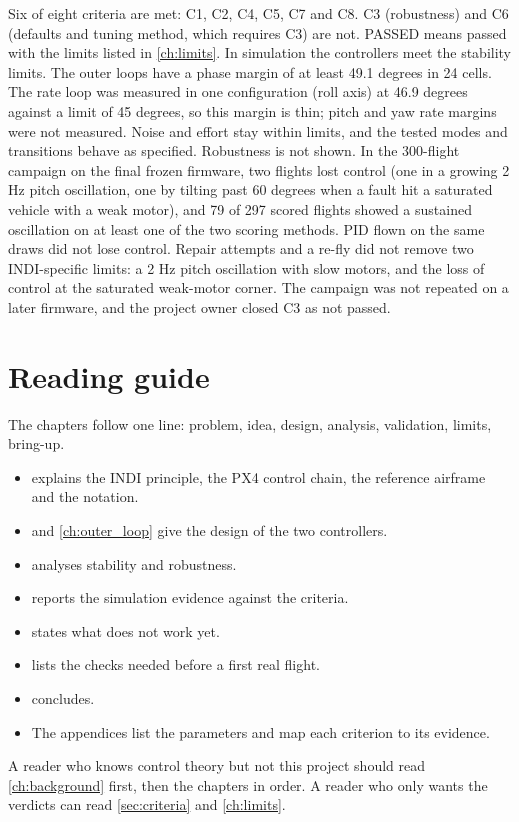 \begin{keyresult}
Six of eight criteria are met: C1, C2, C4, C5, C7 and C8.
C3 (robustness) and C6 (defaults and tuning method, which requires C3) are not.
PASSED means passed with the limits listed in \cref{ch:limits}.
In simulation the controllers meet the stability limits.
The outer loops have a phase margin of at least 49.1 degrees in 24 cells.
The rate loop was measured in one configuration (roll axis) at 46.9 degrees against a limit of 45 degrees, so this margin is thin; pitch and yaw rate margins were not measured.
Noise and effort stay within limits, and the tested modes and transitions behave as specified.
Robustness is not shown.
In the 300-flight campaign on the final frozen firmware, two flights lost control (one in a growing 2 Hz pitch oscillation, one by tilting past 60 degrees when a fault hit a saturated vehicle with a weak motor), and 79 of 297 scored flights showed a sustained oscillation on at least one of the two scoring methods.
PID flown on the same draws did not lose control.
Repair attempts and a re-fly did not remove two INDI-specific limits: a 2 Hz pitch oscillation with slow motors, and the loss of control at the saturated weak-motor corner.
The campaign was not repeated on a later firmware, and the project owner closed C3 as not passed.
\end{keyresult}

\section{Reading guide}\label{sec:guide}

The chapters follow one line: problem, idea, design, analysis, validation, limits, bring-up.
\begin{itemize}
  \item {} explains the INDI principle, the PX4 control chain, the reference airframe and the notation.
  \item {} and \cref{ch:outer_loop} give the design of the two controllers.
  \item {} analyses stability and robustness.
  \item {} reports the simulation evidence against the criteria.
  \item {} states what does not work yet.
  \item {} lists the checks needed before a first real flight.
  \item {} concludes.
  \item The appendices list the parameters and map each criterion to its evidence.
\end{itemize}
A reader who knows control theory but not this project should read \cref{ch:background} first, then the chapters in order.
A reader who only wants the verdicts can read \cref{sec:criteria} and \cref{ch:limits}.
